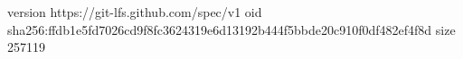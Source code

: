 version https://git-lfs.github.com/spec/v1
oid sha256:ffdb1e5fd7026cd9f8fc3624319e6d13192b444f5bbde20c910f0df482ef4f8d
size 257119
